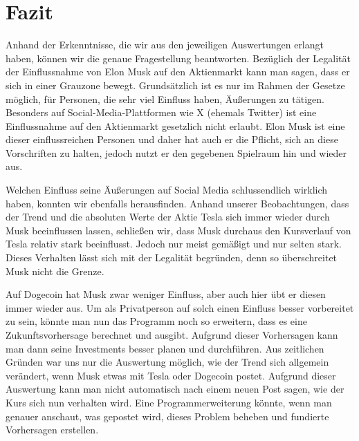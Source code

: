 \documentclass{article}
\begin{document}
\section{Fazit}
Anhand der Erkenntnisse, die wir aus den jeweiligen Auswertungen erlangt haben, können wir die genaue Fragestellung beantworten. Bezüglich der Legalität der Einflussnahme von Elon Musk auf den Aktienmarkt kann man sagen, dass er sich in einer Grauzone bewegt. Grundsätzlich ist es nur im Rahmen der Gesetze möglich, für Personen, die sehr viel Einfluss haben, Äußerungen zu tätigen. Besonders auf Social-Media-Plattformen wie X (ehemals Twitter) ist eine Einflussnahme auf den Aktienmarkt gesetzlich nicht erlaubt. Elon Musk ist eine dieser einflussreichen Personen und daher hat auch er die Pflicht, sich an diese Vorschriften zu halten, jedoch nutzt er den gegebenen Spielraum hin und wieder aus.

Welchen Einfluss seine Äußerungen auf Social Media schlussendlich wirklich haben, konnten wir ebenfalls herausfinden. Anhand unserer Beobachtungen, dass der Trend und die absoluten Werte der Aktie Tesla sich immer wieder durch Musk beeinflussen lassen, schließen wir, dass Musk durchaus den Kursverlauf von Tesla relativ stark beeinflusst. Jedoch nur meist gemäßigt und nur selten stark. Dieses Verhalten lässt sich mit der Legalität begründen, denn so überschreitet Musk nicht die Grenze.

Auf Dogecoin hat Musk zwar weniger Einfluss, aber auch hier übt er diesen immer wieder aus. Um als Privatperson auf solch einen Einfluss besser vorbereitet zu sein, könnte man nun das Programm noch so erweitern, dass es eine Zukunftsvorhersage berechnet und ausgibt. Aufgrund dieser Vorhersagen kann man dann seine Investments besser planen und durchführen. Aus zeitlichen Gründen war uns nur die Auswertung möglich, wie der Trend sich allgemein verändert, wenn Musk etwas mit Tesla oder Dogecoin postet. Aufgrund dieser Auswertung kann man nicht automatisch nach einem neuen Post sagen, wie der Kurs sich nun verhalten wird. Eine Programmerweiterung könnte, wenn man genauer anschaut, was gepostet wird, dieses Problem beheben und fundierte Vorhersagen erstellen.
\end{document}

